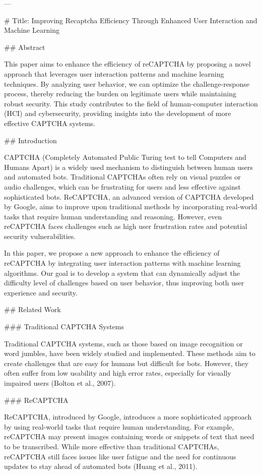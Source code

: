 ---

# Title: Improving Recaptcha Efficiency Through Enhanced User Interaction and Machine Learning

## Abstract

This paper aims to enhance the efficiency of reCAPTCHA by proposing a novel approach that leverages user interaction patterns and machine learning techniques. By analyzing user behavior, we can optimize the challenge-response process, thereby reducing the burden on legitimate users while maintaining robust security. This study contributes to the field of human-computer interaction (HCI) and cybersecurity, providing insights into the development of more effective CAPTCHA systems.

## Introduction

CAPTCHA (Completely Automated Public Turing test to tell Computers and Humans Apart) is a widely used mechanism to distinguish between human users and automated bots. Traditional CAPTCHAs often rely on visual puzzles or audio challenges, which can be frustrating for users and less effective against sophisticated bots. ReCAPTCHA, an advanced version of CAPTCHA developed by Google, aims to improve upon traditional methods by incorporating real-world tasks that require human understanding and reasoning. However, even reCAPTCHA faces challenges such as high user frustration rates and potential security vulnerabilities.

In this paper, we propose a new approach to enhance the efficiency of reCAPTCHA by integrating user interaction patterns with machine learning algorithms. Our goal is to develop a system that can dynamically adjust the difficulty level of challenges based on user behavior, thus improving both user experience and security.

## Related Work

### Traditional CAPTCHA Systems

Traditional CAPTCHA systems, such as those based on image recognition or word jumbles, have been widely studied and implemented. These methods aim to create challenges that are easy for humans but difficult for bots. However, they often suffer from low usability and high error rates, especially for visually impaired users (Bolton et al., 2007).

### ReCAPTCHA

ReCAPTCHA, introduced by Google, introduces a more sophisticated approach by using real-world tasks that require human understanding. For example, reCAPTCHA may present images containing words or snippets of text that need to be transcribed. While more effective than traditional CAPTCHAs, reCAPTCHA still faces issues like user fatigue and the need for continuous updates to stay ahead of automated bots (Huang et al., 2011).

